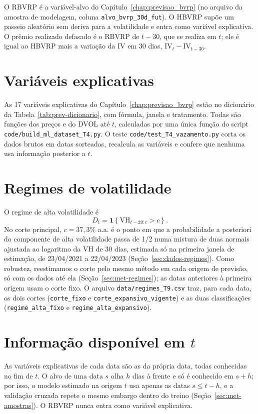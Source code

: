 O RBVRP é a variável-alvo do Capítulo~\ref{chap:previsao_bvrp} (no arquivo da
amostra de modelagem, coluna \texttt{alvo\_bvrp\_30d\_fut}). O HBVRP supõe um
passeio aleatório sem deriva para a volatilidade e entra como
variável explicativa. O prêmio realizado defasado é o RBVRP de $t-30$, que se
realiza em $t$; ele é igual ao HBVRP mais a variação da IV em 30 dias,
$\text{IV}_t - \text{IV}_{t-30}$.

\section{Variáveis explicativas}

As 17 variáveis explicativas do Capítulo~\ref{chap:previsao_bvrp} estão no
dicionário da Tabela~\ref{tab:prev-dicionario}, com fórmula, janela e
tratamento. Todas são funções dos preços e do DVOL até $t$, calculadas por
uma única função do script \texttt{code/build\_ml\_dataset\_T4.py}. O teste
\texttt{code/test\_T4\_vazamento.py} corta os dados brutos em datas sorteadas,
recalcula as variáveis e confere que nenhuma usa informação posterior a $t$.

\section{Regimes de volatilidade}

O regime de alta volatilidade é
\[
D_t = \mathbf{1}\left\{\text{VH}_{t-29:t} > c\right\}.
\]
No corte principal, $c = 37{,}3\%$ a.a. é o ponto em que a probabilidade a
posteriori do componente de alta volatilidade passa de 1/2 numa mistura de
duas normais ajustada ao logaritmo da VH de 30 dias, estimada só na primeira
janela de estimação, de 23/04/2021 a 22/04/2023
(Seção~\ref{sec:dados-regimes}). Como robustez, reestimamos o corte
pelo mesmo método em cada origem de previsão, só com os dados até ela
(Seção~\ref{sec:met-regimes}); as datas anteriores à primeira origem usam o
corte fixo. O arquivo \texttt{data/regimes\_T9.csv} traz,
para cada data, os dois cortes (\texttt{corte\_fixo} e
\texttt{corte\_expansivo\_vigente}) e as duas classificações
(\texttt{regime\_alta\_fixo} e \texttt{regime\_alta\_expansivo}).

\section{Informação disponível em \texorpdfstring{$t$}{t}}

As variáveis explicativas de cada data são as da própria data, todas
conhecidas no fim de $t$. O alvo de uma data $s$ olha $h$ dias à frente e só
é conhecido em $s+h$; por isso, o modelo estimado na origem $t$ usa apenas as
datas $s \le t - h$, e a validação cruzada repete o mesmo embargo dentro do
treino (Seção~\ref{sec:met-amostras}). O RBVRP nunca entra como variável
explicativa.
